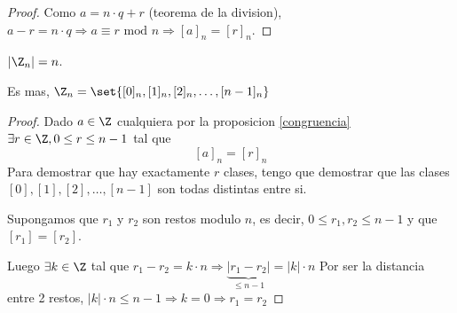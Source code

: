 \begin{proof}
	\label{congruencia}
	Como \(a = n \cdot q + r \) (teorema de la division), \(a - r = n \cdot q \Rightarrow a \equiv r \text{ mod } n \Rightarrow [a]_n = [r]_n\).
\end{proof}

\begin{theorem}
	\(|\Z_n| = n\).

	Es mas, \(\Z_n = \set{[0]_n,[1]_n,[2]_n, \ldots, [n-1]_n}\)
\end{theorem}
\begin{proof}
	Dado \(a \in \Z \) cualquiera por la proposicion \ref{congruencia} \(\exists r \in \Z, 0 \leq  r \leq  n - 1 \) tal que
	\[
		[a]_n = [r]_n
	\]
	Para demostrar que hay exactamente \(r \) clases, tengo que demostrar que las clases \([0], [1], [2], \ldots, [n-1 ]\) son todas distintas entre si.

	Supongamos que \(r_1 \) y \(r_2 \) son restos modulo \(n \), es decir, \(0 \leq r_1,r_2 \leq n- 1\) y que \([r_1] = [r_2 ]\).

	Luego \(\exists k \in \Z \) tal que \(r_1 - r_2 = k \cdot n \Rightarrow \underbrace{|r_{1}-r_{2}|}_{\leq n-1} = |k| \cdot n \)
	Por ser la distancia entre 2 restos, \(|k| \cdot n \leq n - 1 \Rightarrow k = 0 \Rightarrow r_1 = r_2 \)
\end{proof}

